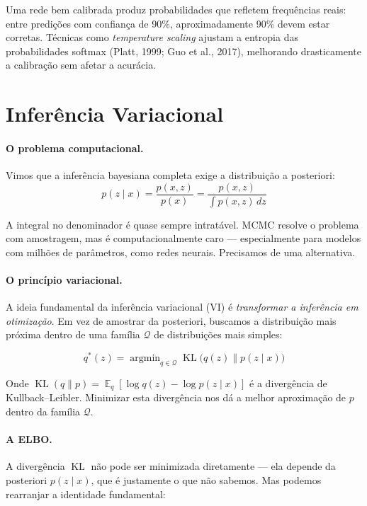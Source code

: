 \documentclass{tufte-handout}
\DeclareMathOperator*{\argmin}{argmin}
\DeclareMathOperator{\E}{\mathbb{E}}
\DeclareMathOperator{\KL}{KL}
\begin{document}
Uma rede bem calibrada produz probabilidades que refletem frequências reais: entre
predições com confiança de 90\%, aproximadamente 90\% devem estar corretas. Técnicas
como \textit{temperature scaling} ajustam a entropia das probabilidades softmax
(Platt, 1999; Guo et al., 2017), melhorando drasticamente a calibração sem afetar a
acurácia.

\section{Inferência Variacional}

\paragraph{O problema computacional.}

Vimos que a inferência bayesiana completa exige a distribuição a posteriori:
\[
p(z \mid x) = \frac{p(x, z)}{p(x)} = \frac{p(x, z)}{\int p(x, z) \, dz}
\]

A integral no denominador é quase sempre intratável. MCMC resolve o problema com
amostragem, mas é computacionalmente caro --- especialmente para modelos com milhões
de parâmetros, como redes neurais. Precisamos de uma alternativa.

\paragraph{O princípio variacional.}

A ideia fundamental da inferência variacional (VI) é \textit{transformar a inferência
em otimização}. Em vez de amostrar da posteriori, buscamos a distribuição mais próxima
dentro de uma família $\mathcal{Q}$ de distribuições mais simples:

\[
q^*(z) = \argmin_{q \in \mathcal{Q}} \KL\big(q(z) \parallel p(z \mid x)\big)
\]

Onde $\KL(q \parallel p) = \E_q[\log q(z) - \log p(z \mid x)]$ é a divergência de
Kullback--Leibler. Minimizar esta divergência nos dá a melhor aproximação de $p$
dentro da família $\mathcal{Q}$.

\paragraph{A ELBO.}

A divergência $\KL$ não pode ser minimizada diretamente --- ela depende da
posteriori $p(z \mid x)$, que é justamente o que não sabemos. Mas podemos rearranjar
a identidade fundamental:
\end{document}
